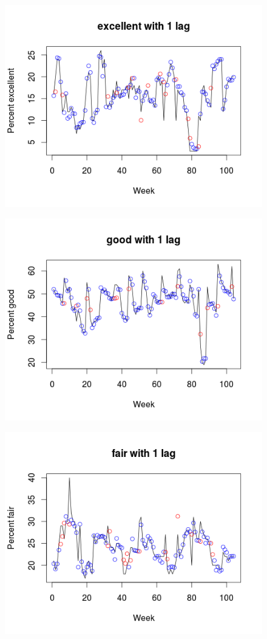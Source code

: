 \documentclass[a4paper]{apa6}
\begin{document}
\begin{center}
\begin{figure}
\includegraphics[width=0.8\linewidth]{excellentlag1.png}
\caption{}
\end{figure}
\begin{figure}
\includegraphics[width=0.8\linewidth]{goodlag1.png}
\caption{}
\end{figure}
\begin{figure}
\includegraphics[width=0.8\linewidth]{fairlag1.png}

\end{figure}
\end{center}
\end{document}
